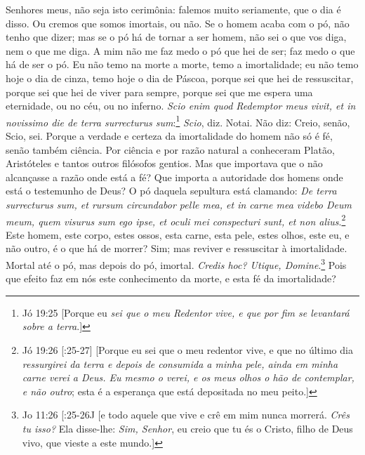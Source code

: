 Senhores meus, não seja isto cerimônia: falemos muito
seriamente, que o dia é disso. Ou cremos que somos imortais, ou não. Se
o homem acaba com o pó, não tenho que dizer; mas se o pó há de tornar a
ser homem, não sei o que vos diga, nem o que me diga. A mim não me faz
medo o pó que hei de ser; faz medo o que há de ser o pó. Eu não temo na
morte a morte, temo a imortalidade; eu não temo hoje o dia de cinza,
temo hoje o dia de Páscoa, porque sei que hei de ressuscitar, porque sei
que hei de viver para sempre, porque sei que me espera uma eternidade,
ou no céu, ou no inferno. \emph{Scio enim quod Redemptor meus vivit, et
in novissimo die de terra surrecturus sum}:\footnote{Jó 19:25 [Porque eu \emph{sei que o meu Redentor vive, e que por fim se levantará sobre a terra}.]} \emph{Scio}, diz. Notai.
Não diz: Creio, senão, Scio, sei. Porque a verdade e certeza da
imortalidade do homem não só é fé, senão também ciência. Por ciência e
por razão natural a conheceram Platão, Aristóteles e tantos outros
filósofos gentios. Mas que importava que o não alcançasse a razão onde
está a fé? Que importa a autoridade dos homens onde está o testemunho de
Deus? O pó daquela sepultura está clamando: \emph{De terra surrecturus
sum, et rursum circundabor pelle mea, et in carne mea videbo Deum meum,
quem visurus sum ego ipse, et oculi mei conspecturi sunt, et non alius}.\footnote{Jó 19:26 [:25-27] [Porque eu sei que o meu redentor vive, e que no último dia \emph{ressurgirei da terra e depois de consumida a minha pele, ainda em minha carne verei a Deus. Eu mesmo o verei, e os meus olhos o hão de contemplar, e não outro}; esta é a esperança que está depositada no meu peito.]} Este homem, este corpo, estes ossos, esta
carne, esta pele, estes olhos, este eu, e não outro, é o que há de
morrer? Sim; mas reviver e ressuscitar à imortalidade. Mortal até o pó,
mas depois do pó, imortal. \emph{Credis hoc? Utique, Domine}.\footnote{Jo 11:26 [:25-26J [e todo aquele que vive e crê em mim nunca morrerá. \emph{Crês tu isso?} Ela disse-lhe:
\emph{Sim, Senhor}, eu creio que tu és o Cristo, filho de Deus vivo, que vieste a este mundo.]} Pois que efeito faz em nós este conhecimento da morte, e esta fé da imortalidade?

